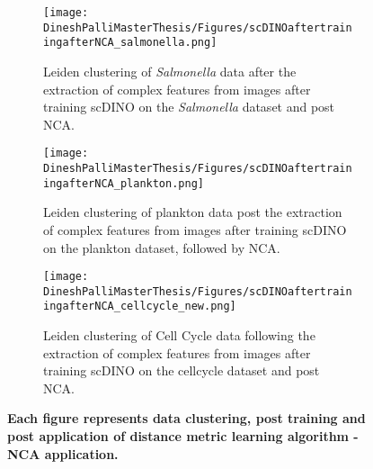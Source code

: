 \documentclass[12pt,a4paper]{article}
\begin{document}
\begin{figure}
  \centering
  \begin{subfigure}{\linewidth}
    \texttt{[image: DineshPalliMasterThesis/Figures/scDINOaftertrainingafterNCA\_salmonella.png]}
    \caption{Leiden clustering of \textit{Salmonella} data after the extraction of complex features from images after training scDINO on the \textit{Salmonella} dataset and post NCA.}
    \label{multifig7:image_a}
  \end{subfigure}
  \hfill
  \begin{subfigure}{\linewidth}
    \texttt{[image: DineshPalliMasterThesis/Figures/scDINOaftertrainingafterNCA\_plankton.png]}
    \caption{Leiden clustering of plankton data post the extraction of complex features from images after training scDINO on the plankton dataset, followed by NCA.}
    \label{multifig7:image_b}
  \end{subfigure}
  \hfill
  \begin{subfigure}{\linewidth}
    \texttt{[image: DineshPalliMasterThesis/Figures/scDINOaftertrainingafterNCA\_cellcycle\_new.png]}
    \caption{Leiden clustering of Cell Cycle data following the extraction of complex features from images after training scDINO on the cellcycle dataset and post NCA.}
    \label{multifig7:image_c}
  \end{subfigure}
  \caption[Clustering on features extracted from images, post scDINO training on our datasets]{\textbf{Each figure represents data clustering, post training and post application of distance metric learning algorithm - NCA application.}}
  \label{multifig7:ClustersaftertrainingscDINO}
\end{figure}

\begin{table}[!ht]
\centering
\caption{Table showing the performance of scDINO deep learning network after training, used to extract features from the images. The performance is measured using the cluster purity metric mentioned in \ref{cp}.}
\label{tab:aftertrainingperformanceofscDINO}
\end{table}
\end{document}
